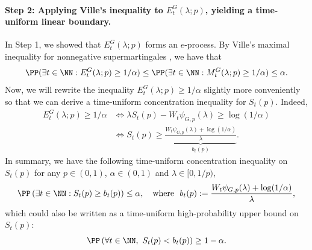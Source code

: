     \paragraph{Step 2: Applying Ville's inequality to $E_t^G(\lambda; p)$, yielding a time-uniform linear boundary.}
    In Step 1, we showed that $E_t^G(\lambda; p)$ forms an $e$-process. By Ville's maximal inequality for nonnegative supermartingales \citep{ville1939etude}, we have that
    \begin{equation}
      \PP(\exists t \in \NN : E_t^G( \lambda; p) \geq 1/\alpha) \leq \PP(\exists t \in \NN : M_t^G( \lambda; p) \geq 1/\alpha) \leq \alpha.
    \end{equation}
    Now, we will rewrite the inequality $E_t^G( \lambda; p) \geq 1/\alpha$ slightly more conveniently so that we can derive a time-uniform concentration inequality for $S_t(p)$. Indeed,
    \begin{align*}
      E_t^G( \lambda; p) \geq 1/\alpha &\iff \lambda S_t(p) - W_t \psi_{G,p}(\lambda) \geq \log(1/\alpha)\\
      &\iff S_t(p) \geq \underbrace{\frac{W_t \psi_{G,p}(\lambda) + \log(1/\alpha)}{\lambda}}_{b_{t}(p)}.
    \end{align*}
    In summary, we have the following time-uniform concentration inequality on $S_t(p)$ for any $p \in (0, 1)$, $\alpha \in (0, 1)$ and $\lambda \in [0, 1/p)$,
    \begin{equation}\label{eq:S_t-concentration-simple}
      \PP \left ( \exists t \in \NN : S_t(p) \geq b_t(p) \right ) \leq \alpha, ~~~\text{where}~~ b_t(p) := \frac{W_t \psi_{G,p}(\lambda)+ \log(1/\alpha)}{\lambda},
    \end{equation}
    which could also be written as a time-uniform high-probability upper bound on $S_t(p)$:
    \begin{equation}
      \PP \left ( \forall t \in \NN, \ S_t(p) < b_t(p) \right ) \geq 1-\alpha.
    \end{equation}
    
